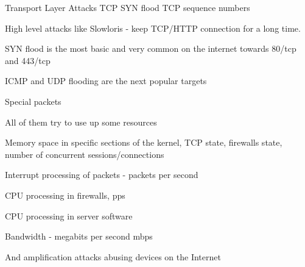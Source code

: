 \documentclass[Screen16to9,17pt]{foils}
\begin{document}


\begin{center}
\begin{tikzpicture}[scale=0.6, transform shape]

\end{tikzpicture}
\end{center}







\begin{list2}
\item Transport Layer Attacks TCP SYN flood TCP sequence numbers
\item High level attacks like Slowloris - keep TCP/HTTP connection for a long time.
\end{list2}


\begin{list2}
\item SYN flood is the most basic and very common on the internet towards 80/tcp and 443/tcp
\item ICMP and UDP flooding are the next popular targets
\item Special packets
\item All of them try to use up some resources
\begin{list2}
\item Memory space in specific sections of the kernel, TCP state, firewalls state, number of concurrent sessions/connections
\item Interrupt processing of packets - packets per second
\item CPU processing in firewalls, pps
\item CPU processing in server software
\item Bandwidth - megabits per second mbps
\item And amplification attacks abusing devices on the Internet
\end{list2}
\end{list2}






\end{document}

